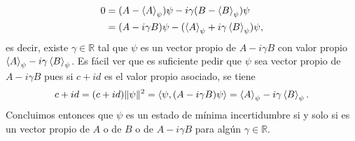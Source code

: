 \documentclass{article}
\begin{document}
\begin{enumerate}
\begin{align}
\begin{split}
0&=(A-\ev{A}_\psi)\psi - i\gamma (B-\ev{B}_\psi)\psi\\
&=(A-i\gamma B)\psi - (\ev{A}_\psi+i\gamma\ev{B}_\psi)\psi,
\end{split}
\end{align}  
es decir, existe $\gamma\in\mathbb{R}$ tal que $\psi$ es un vector propio de $A-i\gamma B$ con valor propio $\ev{A}_\psi-i\gamma\ev{B}_\psi$. Es fácil ver que es suficiente pedir que $\psi$ sea vector propio de $A-i\gamma B$ pues si $c+id$ es el valor propio asociado, se tiene
\begin{equation}
c+id=(c+id)\|\psi\|^2=\langle \psi,(A-i\gamma B)\psi\rangle = \ev{A}_\psi -i\gamma\ev{B}_\psi.
\end{equation} 
Concluimos entonces que $\psi$ es un estado de mínima incertidumbre si y solo si es un vector propio de $A$ o de $B$ o de $A-i\gamma B$ para algún $\gamma\in\mathbb{R}$.


\end{enumerate}
\end{document}

